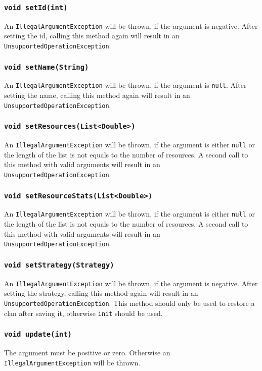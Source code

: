 \documentclass{article}
\begin{document}
\subsubsection{\texttt{void setId(int)}}
An \texttt{IllegalArgumentException} will be thrown, if the argument is negative.
After setting the id, calling this method again will result in an \texttt{UnsupportedOperationException}.

\subsubsection{\texttt{void setName(String)}}
An \texttt{IllegalArgumentException} will be thrown, if the argument is \texttt{null}.
After setting the name, calling this method again will result in an \texttt{UnsupportedOperationException}.

\subsubsection{\texttt{void setResources(List<Double>)}}
An \texttt{IllegalArgumentException} will be thrown, if the argument is either \texttt{null}
or the length of the list is not equals to the number of resources.
A second call to this method with valid arguments will result in an \texttt{UnsupportedOperationException}.

\subsubsection{\texttt{void setResourceStats(List<Double>)}}
An \texttt{IllegalArgumentException} will be thrown, if the argument is either \texttt{null}
or the length of the list is not equals to the number of resources.
A second call to this method with valid arguments will result in an \texttt{UnsupportedOperationException}.

\subsubsection{\texttt{void setStrategy(Strategy)}}
An \texttt{IllegalArgumentException} will be thrown, if the argument is negative.
After setting the strategy, calling this method again will result in an \texttt{UnsupportedOperationException}.
This method should only be used to restore a clan after saving it, otherwise \texttt{init} should be used.

\subsubsection{\texttt{void update(int)}}
The argument must be positive or zero. Otherwise an \texttt{IllegalArgumentException} will be thrown.
\end{document}
